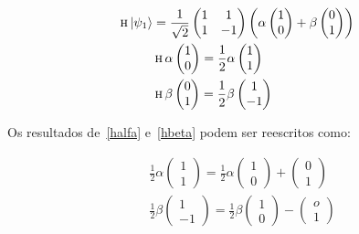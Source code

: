 \begin{align}\label{halfabeta}
\operatorname{\textsc{h}} \ket{\psi_1} &= \frac{1}{\sqrt{2}} \begin{pmatrix}
1 & 1 \\
1 & -1
\end{pmatrix} \left(\alpha \begin{pmatrix}
1 \\
0 
\end{pmatrix} + \beta \begin{pmatrix}
0 \\
1
\end{pmatrix} \right) \nonumber \\
&\operatorname{\textsc{h}} \alpha \begin{pmatrix}
1 \\
0 
\end{pmatrix} = \frac{1}{2} \alpha \begin{pmatrix}
1 \\
1 
\end{pmatrix} \nonumber \\ 
&\operatorname{\textsc{h}} \beta \begin{pmatrix}
0 \\
1
\end{pmatrix} =  \frac{1}{2} \beta \begin{pmatrix}
1 \\
-1
\end{pmatrix} 
\end{align}

Os resultados de~\eqref{halfa} e~\eqref{hbeta} podem ser reescritos como:

\begin{align} \label{alfabetasoma}
&\frac{1}{2} \alpha \begin{pmatrix}
1 \\
1 
\end{pmatrix} = \frac{1}{2} \alpha \begin{pmatrix}
1 \\
0 
\end{pmatrix} + \begin{pmatrix}
0 \\
1 
\end{pmatrix} \nonumber \\
&\frac{1}{2} \beta \begin{pmatrix}
1 \\
-1
\end{pmatrix} = \frac{1}{2} \beta \begin{pmatrix}
1 \\
0
\end{pmatrix} - \begin{pmatrix}
o \\
1
\end{pmatrix} 
\end{align}

